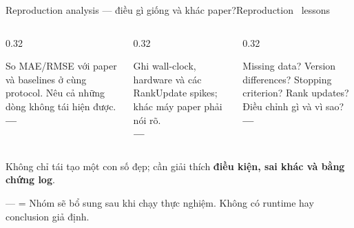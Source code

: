 \begin{frame}[shrink=35]{Reproduction analysis --- điều gì giống và khác paper?}{Reproduction \textperiodcentered\ lessons}
\begin{columns}[T,onlytextwidth]
\begin{column}{0.32\textwidth}
\begin{intuition}[Accuracy]
  So MAE/RMSE với paper và baselines ở cùng protocol. Nêu cả những dòng không tái hiện được.\\[3mm]
  \textbf{---}
\end{intuition}
\end{column}
\begin{column}{0.32\textwidth}
\begin{mathcard}
  Ghi wall-clock, hardware và các RankUpdate spikes; khác máy paper phải nói rõ.\\[3mm]
  \textbf{---}
\end{mathcard}
\end{column}
\begin{column}{0.32\textwidth}
\begin{questioncard}
  \par
  Missing data? Version differences? Stopping criterion? Rank updates? Điều chỉnh gì và vì sao?\\[3mm]
  \textbf{---}
\end{questioncard}
\end{column}
\end{columns}
\vspace{5mm}
\begin{takeaway}
  Không chỉ tái tạo một con số đẹp; cần giải thích \textbf{điều kiện, sai khác và bằng chứng log}.
\end{takeaway}
\vspace{4mm}
\centering
{\color{DTMuted}--- = Nhóm sẽ bổ sung sau khi chạy thực nghiệm. Không có runtime hay conclusion giả định.}
\end{frame}
